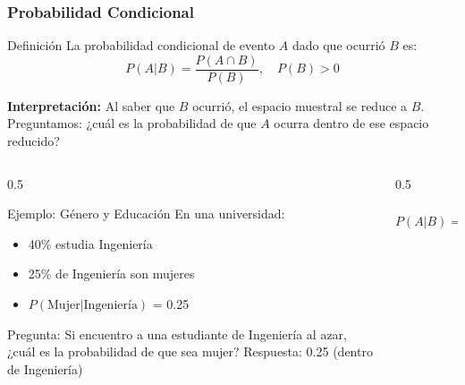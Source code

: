 \documentclass[aspectratio=169,11pt]{beamer}
\begin{document}
\begin{frame}[fragile]
\frametitle{Probabilidad Condicional}

\begin{block}{Definición}
La probabilidad condicional de evento $A$ dado que ocurrió $B$ es:
$$P(A|B) = \frac{P(A \cap B)}{P(B)}, \quad P(B) > 0$$
\end{block}

\pause
\vspace{0.3cm}
\textbf{Interpretación:} Al saber que $B$ ocurrió, el espacio muestral se reduce a $B$. Preguntamos: ¿cuál es la probabilidad de que $A$ ocurra dentro de ese espacio reducido?

\pause
\begin{columns}[T]
\begin{column}{0.5\textwidth}
\begin{exampleblock}{Ejemplo: Género y Educación}
En una universidad:
\begin{itemize}
  \item 40\% estudia Ingeniería
  \item 25\% de Ingeniería son mujeres
  \item $P(\text{Mujer}|\text{Ingeniería})$ = 0.25
\end{itemize}

Pregunta: Si encuentro a una estudiante de Ingeniería al azar, ¿cuál es la probabilidad de que sea mujer?
\pause Respuesta: 0.25 (dentro de Ingeniería)
\end{exampleblock}
\end{column}

\begin{column}{0.5\textwidth}
\begin{center}

\vspace{0.3cm}
\small
$$P(A|B) = \frac{\text{Área } A \cap B}{\text{Área } B}$$
\end{center}
\end{column}
\end{columns}
\end{frame}
\end{document}
